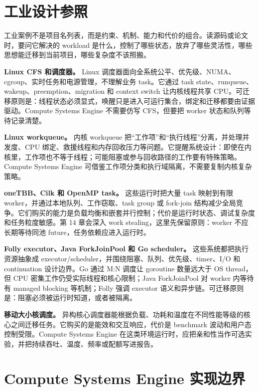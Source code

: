 \section{工业设计参照}

工业案例不是项目名列表，而是约束、机制、能力和代价的组合。读源码或论文时，要问它解决的 workload 是什么，控制了哪些状态，放弃了哪些灵活性，哪些思想能迁移到当前项目，哪些复杂度不该照搬。

\begin{casebox}
\textbf{Linux CFS 和调度器。}
Linux 调度器面向全系统公平、优先级、NUMA、cgroup、实时任务和电源管理，不理解业务 task。它通过 task state、runqueue、wakeup、preemption、migration 和 context switch 让内核线程共享 CPU。可迁移原则是：线程状态必须显式，唤醒只是进入可运行集合，绑定和迁移都要由证据驱动。Compute Systems Engine 不需要仿写 CFS，但要把 worker 状态和队列等待记录清楚。

\textbf{Linux workqueue。}
内核 workqueue 把“工作项”和“执行线程”分离，并处理并发度、CPU 绑定、救援线程和内存回收压力等问题。它提醒系统设计：即使在内核里，工作项也不等于线程；可能阻塞或参与回收路径的工作要有特殊策略。Compute Systems Engine 可借鉴工作项分类和执行域隔离，不需要复制内核复杂策略。

\textbf{oneTBB、Cilk 和 OpenMP task。}
这些运行时把大量 task 映射到有限 worker，并通过本地队列、工作窃取、task group 或 fork-join 结构减少全局竞争。它们购买的能力是负载均衡和嵌套并行控制；代价是运行时状态、调试复杂度和任务粒度敏感。第 14 章会深入 work stealing，这里先保留原则：worker 不应长期等待同池 future，任务依赖应进入运行时。

\textbf{Folly executor、Java ForkJoinPool 和 Go scheduler。}
这些系统都把执行资源抽象成 executor/scheduler，并围绕阻塞、队列、优先级、timer、I/O 和 continuation 设计边界。Go 通过 M:N 调度让 goroutine 数量远大于 OS thread，但 CPU 密集工作仍受实际线程和核心限制；Java ForkJoinPool 对 worker 内等待有 managed blocking 等机制；Folly 强调 executor 语义和异步链。可迁移原则是：阻塞必须被运行时知道，或者被隔离。

\textbf{移动大小核调度。}
异构核心调度器能根据负载、功耗和温度在不同性能等级的核心之间迁移任务。它购买的是能效和交互响应，代价是 benchmark 波动和用户态控制受限。Compute Systems Engine 在这类环境运行时，应把亲和性当作可选实验，并把持续吞吐、温度、频率或配额写进报告。
\end{casebox}

\section{Compute Systems Engine 实现边界}

